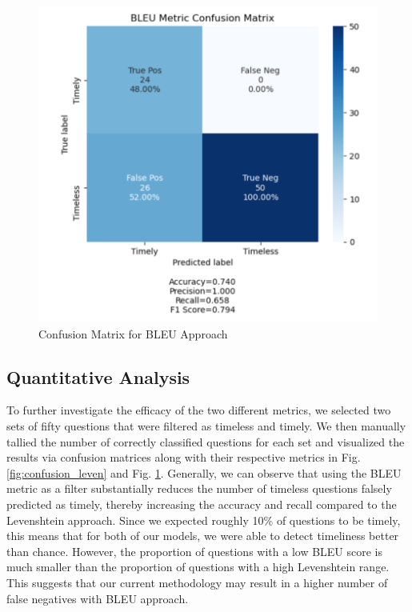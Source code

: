 \documentclass{article}
\begin{document}
\begin{figure}[t!]
 \begin{center}
        \includegraphics[scale=0.5]{bleu.PNG}
	\end{center}  
  \caption{Confusion Matrix for BLEU Approach}
  \label{fig:confusion_bleu}
\end{figure}

\subsection{Quantitative Analysis}

To further investigate the efficacy of the two different metrics, we selected two sets of fifty questions that were filtered as timeless and timely. We then manually tallied the number of correctly classified questions for each set and visualized the results via confusion matrices along with their respective metrics in Fig. \ref{fig:confusion_leven} and Fig. \ref{fig:confusion_bleu}. Generally, we can observe that using the BLEU metric as a filter substantially reduces the number of timeless questions falsely predicted as timely, thereby increasing the accuracy and recall compared to the Levenshtein approach. Since we expected roughly 10\% of questions to be timely, this means that for both of our models, we were able to detect timeliness better than chance. However, the proportion of questions with a low BLEU score is much smaller than the proportion of questions with a high Levenshtein range. This suggests that our current methodology may result in a higher number of false negatives with BLEU approach. 
\end{document}
